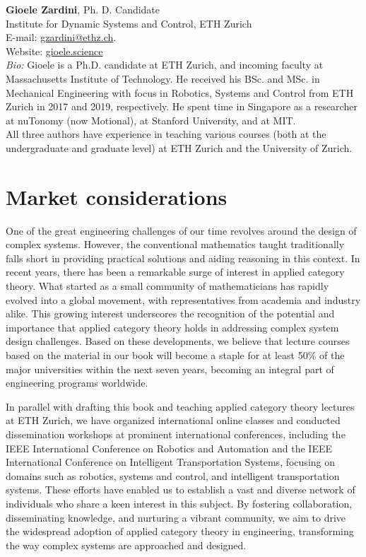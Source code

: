 \documentclass[10pt, article, one side]{memoir}
\begin{document}
    \noindent \textbf{Gioele Zardini}, Ph.
    D.
    Candidate\\
    Institute for Dynamic Systems and Control, ETH Zurich\\
    E-mail: \href{mailto:gzardini@ethz.ch}{gzardini@ethz.ch}.
    \\
    Website: \href{https://gioele.science}{gioele.science}\\
    \emph{Bio:}
    Gioele is a Ph.D.
    candidate at ETH Zurich, and incoming faculty at Massachusetts Institute of Technology.
    He received his BSc.
    and MSc. in Mechanical Engineering with focus in Robotics, Systems and Control from ETH Zurich in 2017 and 2019, respectively.
    He spent time in Singapore as a researcher at nuTonomy (now Motional), at Stanford University, and at MIT.
    \\

    All three authors have experience in teaching various courses (both at the undergraduate and graduate level) at ETH Zurich and the University of Zurich.

    \section{Market considerations}
    One of the great engineering challenges of our time revolves around the design of complex systems.
    However, the conventional mathematics taught traditionally falls short in providing practical solutions and aiding reasoning in this context.
    In recent years, there has been a remarkable surge of interest in applied category theory.
    What started as a small community of mathematicians has rapidly evolved into a global movement, with representatives from academia and industry alike.
    This growing interest underscores the recognition of the potential and importance that applied category theory holds in addressing complex system design challenges.
    Based on these developments, we believe that lecture courses based on the material in our book will become a staple for at least 50\% of the major universities within the next seven years, becoming an integral part of engineering programs worldwide.

    In parallel with drafting this book and teaching applied category theory lectures at ETH Zurich, we have organized international online classes and conducted dissemination workshops at prominent international conferences, including the IEEE International Conference on Robotics and Automation and the IEEE International Conference on Intelligent Transportation Systems, focusing on domains such as robotics, systems and control, and intelligent transportation systems.
    These efforts have enabled us to establish a vast and diverse network of individuals who share a keen interest in this subject.
    By fostering collaboration, disseminating knowledge, and nurturing a vibrant community, we aim to drive the widespread adoption of applied category theory in engineering, transforming the way complex systems are approached and designed.
\end{document}
